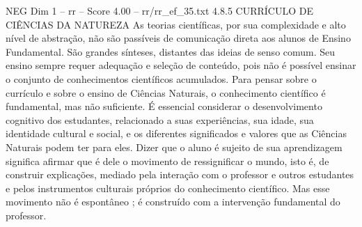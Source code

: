 \begin{textsample}{NEG Dim 1 – rr – Score 4.00 – rr/rr\_ef\_35.txt}  \label{ex:f1_neg_079}
4.8.5 CURRÍCULO DE CIÊNCIAS DA NATUREZA As teorias científicas, por sua complexidade e alto nível de abstração, não são passíveis de comunicação direta aos alunos de Ensino Fundamental.
São grandes sínteses, distantes das ideias de senso comum.
Seu ensino sempre requer adequação e seleção de conteúdo, pois não é possível ensinar o conjunto de conhecimentos científicos acumulados.
Para pensar sobre o currículo e sobre o ensino de Ciências Naturais, o conhecimento científico é fundamental, mas não suficiente.
É essencial considerar o desenvolvimento cognitivo dos estudantes, relacionado a suas experiências, sua idade, sua identidade cultural e social, e os diferentes significados e valores que as Ciências Naturais podem ter para eles.
Dizer que o aluno é sujeito de sua aprendizagem significa afirmar que é dele o movimento de ressignificar o mundo, isto é, de construir explicações, mediado pela interação com o professor e outros estudantes e pelos instrumentos culturais próprios do conhecimento científico.
Mas esse movimento não é espontâneo ; é construído com a intervenção fundamental do professor.

\end{textsample}

